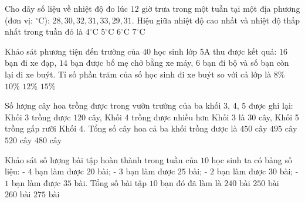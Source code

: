\begin{ex} %
Cho dãy số liệu về nhiệt độ đo lúc $12\text{ giờ}$ trưa trong một tuần tại một địa phương (đơn vị: $^{\circ}\text{C}$): $28, 30, 32, 31, 33, 29, 31$. Hiệu giữa nhiệt độ cao nhất và nhiệt độ thấp nhất trong tuần đó là
\choice
{$4^{\circ}\text{C}$}
{\True $5^{\circ}\text{C}$}
{$6^{\circ}\text{C}$}
{$7^{\circ}\text{C}$}
\end{ex}

\begin{ex} %
Khảo sát phương tiện đến trường của $40$ học sinh lớp 5A thu được kết quả: $16$ bạn đi xe đạp, $14$ bạn được bố mẹ chở bằng xe máy, $6$ bạn đi bộ và số bạn còn lại đi xe buýt. Tỉ số phần trăm của số học sinh đi xe buýt so với cả lớp là
\choice
{$8\%$}
{\True $10\%$}
{$12\%$}
{$15\%$}
\end{ex}

\begin{ex} %
Số lượng cây hoa trồng được trong vườn trường của ba khối 3, 4, 5 được ghi lại: Khối 3 trồng được $120$ cây, Khối 4 trồng được nhiều hơn Khối 3 là $30$ cây, Khối 5 trồng gấp rưỡi Khối 4. Tổng số cây hoa cả ba khối trồng được là
\choice
{$450\text{ cây}$}
{\True $495\text{ cây}$}
{$520\text{ cây}$}
{$480\text{ cây}$}
\end{ex}

\begin{ex} %
Khảo sát số lượng bài tập hoàn thành trong tuần của $10$ học sinh ta có bảng số liệu:
- $4$ bạn làm được $20$ bài;
- $3$ bạn làm được $25$ bài;
- $2$ bạn làm được $30$ bài;
- $1$ bạn làm được $35$ bài.
Tổng số bài tập $10$ bạn đó đã làm là
\choice
{$240\text{ bài}$}
{\True $250\text{ bài}$}
{$260\text{ bài}$}
{$275\text{ bài}$}
\end{ex}

